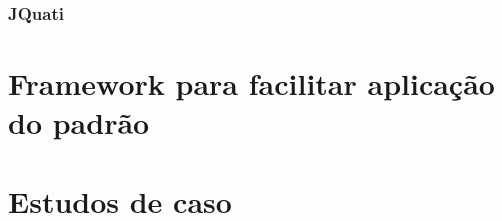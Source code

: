\documentclass[12pt,a4paper,oneside]{book}
\begin{document}
\subsection{JQuati}




\chapter{Framework para facilitar aplicação do padrão}

\chapter{Estudos de caso}
\end{document}
